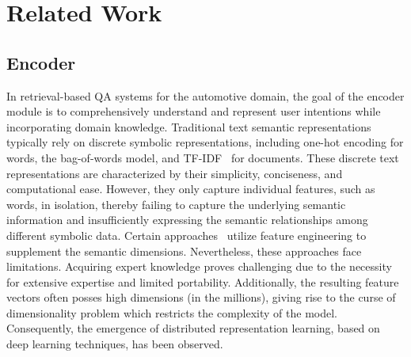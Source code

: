 \documentclass[mathematics,article,submit,moreauthors]{Definitions/mdpi}
\newcommand{\1}[1]{\mathds{1}\left[#1\right]}
\begin{document}
\section{Related Work}
\label{sec:related}

\subsection{Encoder}
In retrieval-based QA systems for the automotive domain, the goal of the encoder module is to comprehensively understand and represent user intentions while incorporating domain knowledge. Traditional text semantic representations typically rely on discrete symbolic representations, including one-hot encoding for words, the bag-of-words model, and TF-IDF~\cite{tf-idf} for documents. These discrete text representations are characterized by their simplicity, conciseness, and computational ease. However, they only capture individual features, such as words, in isolation, thereby failing to capture the underlying semantic information and insufficiently expressing the semantic relationships among different symbolic data. Certain approaches~\cite{hand-crafted-features,tweet} utilize feature engineering to supplement the semantic dimensions. Nevertheless, these approaches face limitations. Acquiring expert knowledge proves challenging due to the necessity for extensive expertise and limited portability. Additionally, the resulting feature vectors often posses high dimensions (in the millions), giving rise to the curse of dimensionality problem which restricts the complexity of the model. Consequently, the emergence of distributed representation learning, based on deep learning techniques, has been observed.
\end{document}
